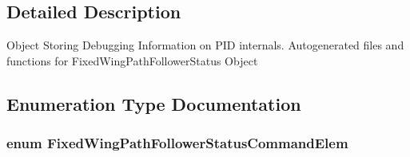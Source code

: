\subsection{\-Detailed \-Description}
\-Object \-Storing \-Debugging \-Information on \-P\-I\-D internals. \-Autogenerated files and functions for \-Fixed\-Wing\-Path\-Follower\-Status \-Object 

\subsection{\-Enumeration \-Type \-Documentation}
\hypertarget{group___fixed_wing_path_follower_status_ga4f450eb4e7f0a07c8b0c36520719a2d8}{
\subsubsection[{\-Fixed\-Wing\-Path\-Follower\-Status\-Command\-Elem}]{\setlength{\rightskip}{0pt plus 5cm}enum {\bf \-Fixed\-Wing\-Path\-Follower\-Status\-Command\-Elem}}}\label{group___fixed_wing_path_follower_status_ga4f450eb4e7f0a07c8b0c36520719a2d8}
